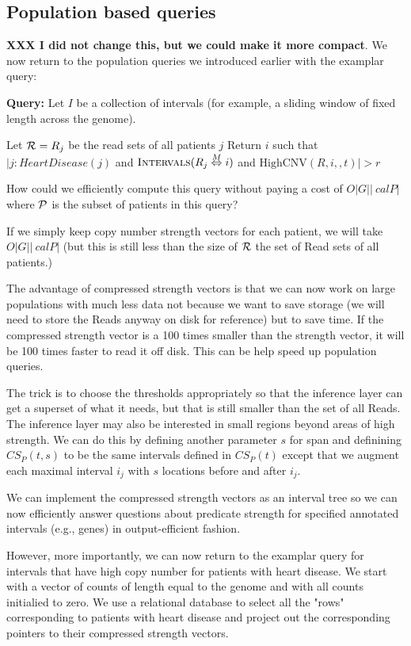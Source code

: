 \documentclass[10pt,fullpage]{article}
\def\ensuretext{\textrm}
\newcommand{\Intervals}{\ensuretext{{\sc Intervals}}}
\newcommand{\MapRel}{\ensuremath{\stackrel{M}{\Leftrightarrow}}}
\begin{document}
\subsection{Population based queries}
{\bf XXX I did not change this, but we could make it more compact}. 
We now return to the population queries we introduced
earlier with the examplar query:

{\bf Query:} Let $I$ be a collection of intervals (for example, a
sliding window of fixed length across the genome).

Let ${\cal R} = {R_j}$ be the read sets of all patients $j$
Return ${i}$ such  that $|j: HeartDisease(j)$ and
$\Intervals(R_j\MapRel i)$ and $\mbox{HighCNV}(R,i,,t)| > r$

How could we efficiently compute this query without paying
a cost of $O |G| |{\ cal P}|$ where ${\cal P}$ is the subset
of patients in this query?

If we simply keep copy number strength vectors for each
patient, we will take $O |G| |{\ cal P}|$ (but this is
still less than the size of ${\cal R}$ the set of Read
sets of all patients.)  

The advantage of compressed strength vectors is that 
we can now work on large populations with much less data
not because we want to save storage (we will need to store
the Reads anyway on disk for reference) but to save time.
If the compressed strength vector is a 100 times smaller 
than the strength vector, it will be 100 times faster to
read it off disk.  This can be help speed up population 
queries.

The trick is to choose the thresholds appropriately so that
the inference layer can get a superset of what it needs,
but that is still smaller than the set of all Reads.  The
inference layer may also be interested in small regions beyond
areas of high strength.  We can do this by defining another
parameter $s$ for span and definining $CS_P(t,s)$ to be
the same intervals defined in $CS_P(t)$ except that we
augment each maximal interval $i_j$ with $s$ locations 
before and after $i_j$.

We can implement the compressed strength vectors as an interval
tree so we can now efficiently answer questions about 
predicate strength for specified annotated intervals (e.g.,
genes) in output-efficient fashion.

However, more importantly, we can now return to the examplar
query for intervals that have high copy number for patients
with heart disease.  We start with a vector of counts of length 
equal to the genome and with all counts initialied to zero.
We use a relational database to select all the "rows" 
corresponding to patients with heart disease and project out
the corresponding pointers to their compressed strength vectors.
\end{document}

